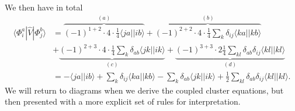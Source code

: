 We then have in total
\begin{equation}
\begin{split}
\langle \Phi_i^a | \hat{V} | \Phi_j^b \rangle
&=
\overbrace{(-1)^{1+2}\cdot 4 \cdot \frac{1}{4} \langle ja || ib \rangle}^{(a)}
+
\overbrace{(-1)^{2+2} \cdot 4 \cdot \frac{1}{4} \sum_k \delta_{ij} \langle ka || kb \rangle}^{(b)} \\
&+
\underbrace{(-1)^{2+3} \cdot 4 \cdot \frac{1}{4} \sum_k \delta_{ab} \langle jk || ik \rangle}_{(c)}
+
\underbrace{(-1)^{3+3} \cdot 2 \frac{1}{4} \sum_{kl} \delta_{ab} \delta_{ij} \langle kl || kl \rangle }_{(d)}\\
&=  - \langle ja || ib \rangle
+  \sum_k \delta_{ij} \langle ka || kb \rangle 
- \sum_k \delta_{ab} \langle jk || ik \rangle
+ \frac{1}{2} \sum_{kl} \delta_{ab} \delta_{ij} \langle kl || kl \rangle  .
\end{split}
\end{equation}
We will return to diagrams 
when we derive the coupled cluster equations, but then 
presented with a more explicit set of rules for interpretation.





